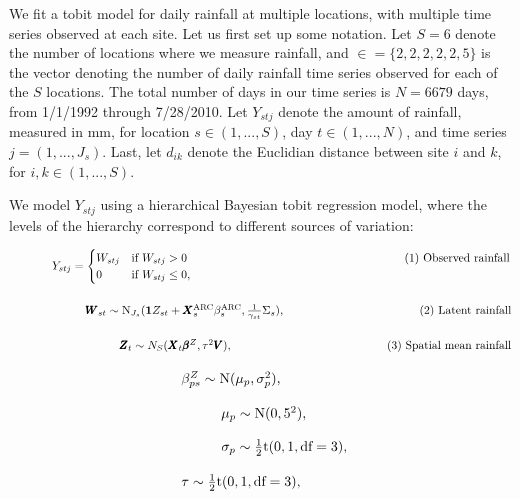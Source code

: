 \documentclass[12pt]{article}
\def\bbeta{\pmb{\beta}}
\def\bX{\pmb{X}}
\def\bZ{\pmb{Z}}
\def\bV{\pmb{V}}
\def\bW{\pmb{W}}
\begin{document}
We fit a tobit model for daily rainfall at multiple locations, with multiple time series observed at each site. Let us first set up some notation. Let $S=6$ denote the number of locations where we measure rainfall, and $\in = \{2,2,2,2,2,5\}$ is the vector denoting the number of daily rainfall time series observed for each of the $S$ locations. The total number of days in our time series is $N=6679$ days, from 1/1/1992 through 7/28/2010. Let $Y_{stj}$ denote the amount of rainfall, measured in mm, for location $s \in (1,...,S)$, day $t \in (1,...,N)$, and time series $j = (1,...,J_s)$. Last, let $d_{ik}$ denote the Euclidian distance between site $i$ and $k$, for $i,k \in (1,...,S)$.

We model $Y_{stj}$ using a hierarchical Bayesian tobit regression model, where the levels of the hierarchy correspond to different sources of variation:

$\hspace{0.5in}
Y_{stj} = \begin{cases} W_{stj} &\mbox{if } W_{stj} > 0 \hspace{2.6in} \text{(1) Observed rainfall}\\
0  &\mbox{if } W_{stj} \leq 0, \end{cases}
$

$\hspace{0.9in}
\bW_{st} \sim \text{N}_{J_s}(\mathbf{1}Z_{st} + \bX^\text{ARC}_s \beta^\text{ARC}_s, \frac{1}{\gamma_{st}}\Sigma_s), \hspace{1.6in} \text{(2) Latent rainfall}
$

$\hspace{1.3in}
\bZ_t \sim N_S(\bX_t \bbeta^Z, \tau^2\bV), \hspace{1.85in} \text{(3) Spatial mean rainfall}
$

$\hspace{1.7in}
\beta_{ps}^Z \sim \text{N}(\mu_p, \sigma^2_p),
$

$\hspace{2.1in}
\mu_{p} \sim \text{N}(0, 5^2),
$

$\hspace{2.1in}
\sigma_{p} \sim \frac{1}{2}\text{t}(0, 1, \text{df} = 3),
$

$\hspace{1.7in}
\tau \sim \frac{1}{2}\text{t}(0, 1, \text{df} = 3),
$
\end{document}
